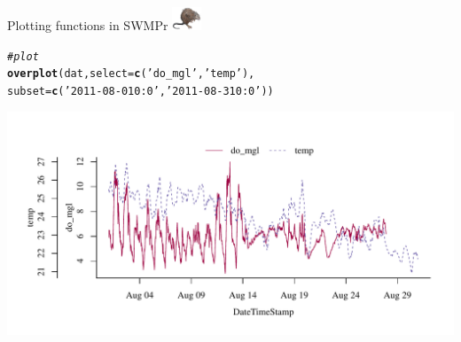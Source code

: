 \documentclass[xcolor=dvipsnames]{beamer}\usepackage[]{graphicx}\usepackage[]{color}
\makeatletter
\newcommand{\hlstr}[1]{\textcolor[rgb]{0.192,0.494,0.8}{#1}}%
\newcommand{\hlcom}[1]{\textcolor[rgb]{0.678,0.584,0.686}{\textit{#1}}}%
\newcommand{\hlstd}[1]{\textcolor[rgb]{0.345,0.345,0.345}{#1}}%
\newcommand{\hlkwc}[1]{\textcolor[rgb]{0.333,0.667,0.333}{#1}}%
\newcommand{\hlkwd}[1]{\textcolor[rgb]{0.737,0.353,0.396}{\textbf{#1}}}%
\newenvironment{kframe}{%
 \def\at@end@of@kframe{}%
 \ifinner\ifhmode%
  \def\at@end@of@kframe{\end{minipage}}%
  \begin{minipage}{\columnwidth}%
 \fi\fi%
 \def\FrameCommand##1{\hskip\@totalleftmargin \hskip-\fboxsep
 \colorbox{shadecolor}{##1}\hskip-\fboxsep
     \hskip-\linewidth \hskip-\@totalleftmargin \hskip\columnwidth}%
 \MakeFramed {\advance\hsize-\width
   \@totalleftmargin\z@ \linewidth\hsize
   \@setminipage}}%
 {\par\unskip\endMakeFramed%
 \at@end@of@kframe}
\newenvironment{knitrout}{}{} %
\makeatother
\begin{document}
\begin{frame}[fragile, t]{Plotting functions in SWMPr \includegraphics[width = 0.065\textwidth]{imgs/swmprat.png}}
\begin{knitrout}\scriptsize
{}\color{fgcolor}\begin{kframe}
\begin{alltt}
\hlcom{# plot}
\hlkwd{overplot}\hlstd{(dat,} \hlkwc{select} \hlstd{=} \hlkwd{c}\hlstd{(}\hlstr{'do_mgl'}\hlstd{,} \hlstr{'temp'}\hlstd{),}
  \hlkwc{subset} \hlstd{=} \hlkwd{c}\hlstd{(}\hlstr{'2011-08-01 0:0'}\hlstd{,} \hlstr{'2011-08-31 0:0'}\hlstd{))}
\end{alltt}
\end{kframe}

{\centering \includegraphics[width=\textwidth]{figure/unnamed-chunk-28-1} 

}



\end{knitrout}
\end{frame}
\end{document}
